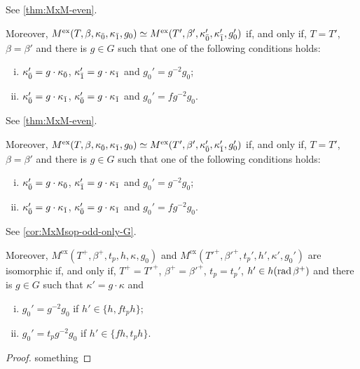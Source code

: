 \begin{thm}
        See \cref{thm:MxM-even}.
    
           Moreover, $M^{\mathrm{ex}} (T, \beta, \kappa_{\bar{0}}, \kappa_{\bar{1}}, g_0) \simeq M^{\mathrm{ex}} (T', \beta', \kappa_{\bar{0}}', \kappa_{\bar{1}}', g_0')$ if, and only if, $T =T'$, $\beta = \beta'$ and there is $g \in G$ such that one of the following conditions holds:
    \begin{enumerate}[(i)]
        \item $\kappa_{\bar{0}}' = g\cdot\kappa_{\bar{0}}$, $\kappa_{\bar{1}}' = g\cdot\kappa_{\bar{1}}$ and $g_0' = g^{-2}g_0$;
        \item $\kappa_{\bar{0}}' = g\cdot\kappa_{\bar{1}}$, $\kappa_{\bar{0}}' = g\cdot\kappa_{\bar{1}}$ and $g_0' = fg^{-2}g_0$. 
    \end{enumerate}
        
    
        See \cref{thm:MxM-even}.
    
        Moreover, $M^{\mathrm{ex}} (T, \beta, \kappa_{\bar{0}}, \kappa_{\bar{1}}, g_0) \simeq M^{\mathrm{ex}} (T', \beta', \kappa_{\bar{0}}', \kappa_{\bar{1}}', g_0')$ if, and only if, $T =T'$, $\beta = \beta'$ and there is $g \in G$ such that one of the following conditions holds:
    \begin{enumerate}[(i)]
        \item $\kappa_{\bar{0}}' = g\cdot\kappa_{\bar{0}}$, $\kappa_{\bar{1}}' = g\cdot\kappa_{\bar{1}}$ and $g_0' = g^{-2}g_0$;
        \item $\kappa_{\bar{0}}' = g\cdot\kappa_{\bar{1}}$, $\kappa_{\bar{0}}' = g\cdot\kappa_{\bar{1}}$ and $g_0' = fg^{-2}g_0$. 
    \end{enumerate}
        
    
            See \cref{cor:MxMsop-odd-only-G}.
    
            Moreover, $M^{\mathrm{ex}}(T^+, \beta^+, t_p, h, \kappa, g_0)$ and $M^{\mathrm{ex}} (T'^+, \beta'^+, t_p',  h', \kappa', g_0')$ are isomorphic if, and only if, $T^+ =T'^+$, $\beta^+ = \beta'^+$, $t_p = t_p'$, $h' \in h (\operatorname{rad} \beta^+)$ and there is $g \in G$ such that $\kappa' = g\cdot\kappa$ and
    \begin{enumerate}[(i)]
        \item $g_0' = g^{-2}g_0$ if $h' \in \{ h, f t_p h\}$;
        \item $g_0' = t_p g^{-2}g_0$ if $h' \in \{ f h, t_p h\}$.
    \end{enumerate}
\end{thm}

\begin{proof}
    something
\end{proof}

